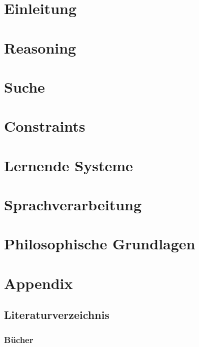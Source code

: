 \documentclass[11pt,fleqn]{book} %
\begin{document}
\pagestyle{fancy} %

\part{Einleitung}


\part{Reasoning}



\part{Suche}




\part{Constraints}


\part{Lernende Systeme}



\part{Sprachverarbeitung}

\part{Philosophische Grundlagen}

\part{Appendix}


\chapter*{Literaturverzeichnis}
\section*{Bücher}
\printbibliography[heading=bibempty,type=book]
\end{document}
